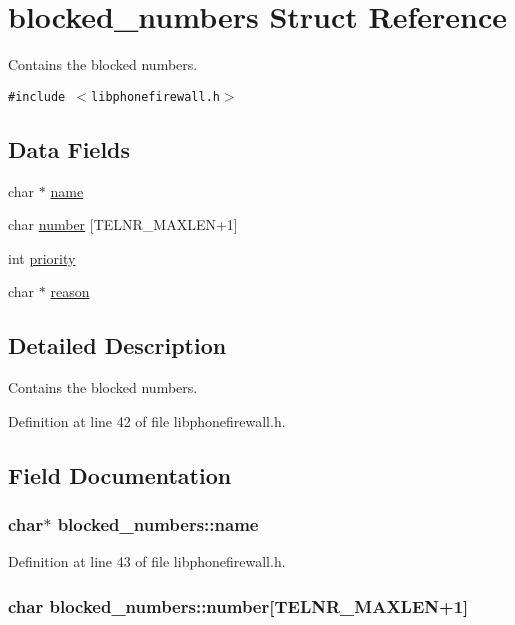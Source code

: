 \hypertarget{structblocked__numbers}{
\section{blocked\_\-numbers Struct Reference}
\label{structblocked__numbers}
}
Contains the blocked numbers.  


{\tt \#include $<$libphonefirewall.h$>$}

\subsection*{Data Fields}
\begin{CompactItemize}
\item 
char $\ast$ \hyperlink{structblocked__numbers_69dad0a7f63520e016b9c93ea27f91ff}{name}
\item 
char \hyperlink{structblocked__numbers_ce3ad62aac7fe42dcbc2e9520d284fcb}{number} \mbox{[}TELNR\_\-MAXLEN+1\mbox{]}
\item 
int \hyperlink{structblocked__numbers_e04cea5a63d4e5e1488dab84c7e28a4b}{priority}
\item 
char $\ast$ \hyperlink{structblocked__numbers_9106d81a8838700a8a335026b1ac1c55}{reason}
\end{CompactItemize}


\subsection{Detailed Description}
Contains the blocked numbers. 

Definition at line 42 of file libphonefirewall.h.

\subsection{Field Documentation}
\hypertarget{structblocked__numbers_69dad0a7f63520e016b9c93ea27f91ff}{
\subsubsection{\setlength{\rightskip}{0pt plus 5cm}char$\ast$ {\bf blocked\_\-numbers::name}}}
\label{structblocked__numbers_69dad0a7f63520e016b9c93ea27f91ff}




Definition at line 43 of file libphonefirewall.h.\hypertarget{structblocked__numbers_ce3ad62aac7fe42dcbc2e9520d284fcb}{
\subsubsection{\setlength{\rightskip}{0pt plus 5cm}char {\bf blocked\_\-numbers::number}\mbox{[}TELNR\_\-MAXLEN+1\mbox{]}}}
\label{structblocked__numbers_ce3ad62aac7fe42dcbc2e9520d284fcb}





